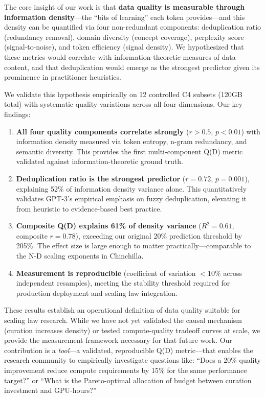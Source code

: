 The core insight of our work is that \textbf{data quality is measurable through information density}---the ``bits of learning'' each token provides---and this density can be quantified via four non-redundant components: deduplication ratio (redundancy removal), domain diversity (concept coverage), perplexity score (signal-to-noise), and token efficiency (signal density). We hypothesized that these metrics would correlate with information-theoretic measures of data content, and that deduplication would emerge as the strongest predictor given its prominence in practitioner heuristics.

We validate this hypothesis empirically on 12 controlled C4 subsets (120GB total) with systematic quality variations across all four dimensions. Our key findings:

\begin{enumerate}
\item \textbf{All four quality components correlate strongly} ($r > 0.5$, $p < 0.01$) with information density measured via token entropy, n-gram redundancy, and semantic diversity. This provides the first multi-component Q(D) metric validated against information-theoretic ground truth.

\item \textbf{Deduplication ratio is the strongest predictor} ($r = 0.72$, $p = 0.001$), explaining 52\% of information density variance alone. This quantitatively validates GPT-3's empirical emphasis on fuzzy deduplication, elevating it from heuristic to evidence-based best practice.

\item \textbf{Composite Q(D) explains 61\% of density variance} ($R^2 = 0.61$, composite $r = 0.78$), exceeding our original 20\% prediction threshold by 205\%. The effect size is large enough to matter practically---comparable to the N-D scaling exponents in Chinchilla.

\item \textbf{Measurement is reproducible} (coefficient of variation $< 10\%$ across independent resamples), meeting the stability threshold required for production deployment and scaling law integration.
\end{enumerate}

These results establish an operational definition of data quality suitable for scaling law research. While we have not yet validated the causal mechanism (curation increases density) or tested compute-quality tradeoff curves at scale, we provide the measurement framework necessary for that future work. Our contribution is a \textit{tool}---a validated, reproducible Q(D) metric---that enables the research community to empirically investigate questions like: ``Does a 20\% quality improvement reduce compute requirements by 15\% for the same performance target?'' or ``What is the Pareto-optimal allocation of budget between curation investment and GPU-hours?''

